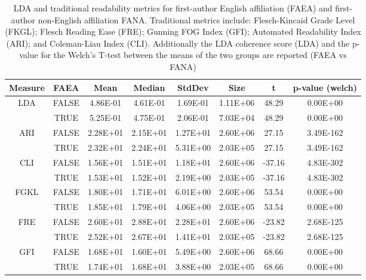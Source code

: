 \documentclass[11pt,a4paper]{article}
\begin{document}
\begin{center}
\begin{table}[ht]
\centering
\caption{LDA and traditional readability metrics for first-author English affiliation (FAEA) and  first-author non-English affiliation FANA. Traditional metrics include: Flesch-Kincaid Grade Level (FKGL); Flesch Reading Ease (FRE); Gunning FOG Index (GFI); Automated Readability Index (ARI); and Coleman-Liau Index (CLI). Additionally the LDA coherence score (LDA) and the p-value for the Welch's T-test between the means of the two groups are reported (FAEA vs FANA)}
\begin{tabular}{|c | c | c | c| c | c | c |c| }
\label{table:scores}
\textbf{Measure} & \textbf{FAEA} & \textbf{Mean} & \textbf{Median} & \textbf{StdDev} & \textbf{Size} & \textbf{t} & \textbf{p-value (welch)} \\
\hline
LDA & FALSE & 4.86E-01 & 4.61E-01 & 1.69E-01 & 1.11E+06 & 48.29 & 0.00E+00 \\
 & TRUE & 5.25E-01 & 4.75E-01 & 2.06E-01 & 7.03E+04 & 48.29 & 0.00E+00 \\
ARI & FALSE & 2.28E+01 & 2.15E+01 & 1.27E+01 & 2.60E+06 & 27.15 & 3.49E-162 \\
 & TRUE & 2.32E+01 & 2.24E+01 & 5.31E+00 & 2.03E+05 & 27.15 & 3.49E-162 \\
CLI & FALSE & 1.56E+01 & 1.51E+01 & 1.18E+01 & 2.60E+06 & -37.16 & 4.83E-302 \\
 & TRUE & 1.53E+01 & 1.52E+01 & 2.19E+00 & 2.03E+05 & -37.16 & 4.83E-302 \\
FGKL & FALSE & 1.80E+01 & 1.71E+01 & 6.01E+00 & 2.60E+06 & 53.54 & 0.00E+00 \\
 & TRUE & 1.85E+01 & 1.79E+01 & 4.06E+00 & 2.03E+05 & 53.54 & 0.00E+00 \\
FRE & FALSE & 2.60E+01 & 2.88E+01 & 2.28E+01 & 2.60E+06 & -23.82 & 2.68E-125 \\
 & TRUE & 2.52E+01 & 2.67E+01 & 1.41E+01 & 2.03E+05 & -23.82 & 2.68E-125 \\
GFI & FALSE & 1.68E+01 & 1.60E+01 & 5.49E+00 & 2.60E+06 & 68.66 & 0.00E+00 \\
 & TRUE & 1.74E+01 & 1.68E+01 & 3.88E+00 & 2.03E+05 & 68.66 & 0.00E+00 \\
\end{tabular}
\end{table}
\end{center}
\end{document}
